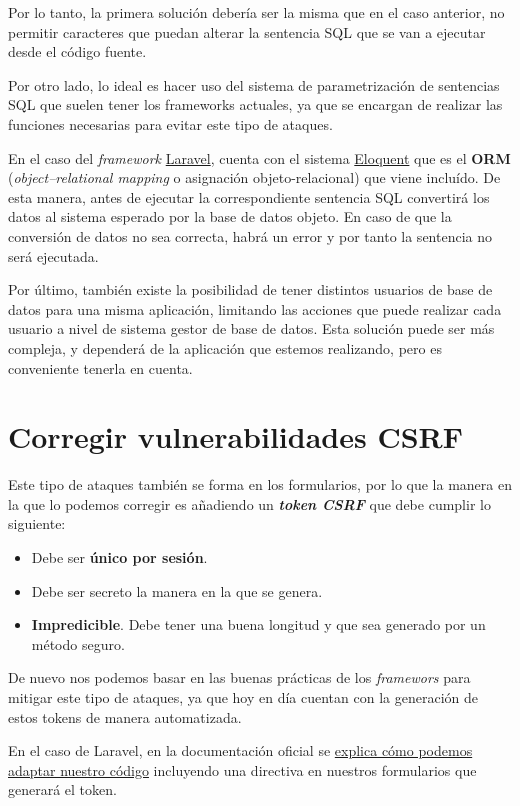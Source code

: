 \documentclass{\ClassPath/viu-tfm-template}
\begin{document}
Por lo tanto, la primera solución debería ser la misma que en el caso anterior, no permitir caracteres que puedan alterar la sentencia SQL que se van a ejecutar desde el código fuente.

Por otro lado, lo ideal es hacer uso del sistema de parametrización de sentencias SQL que suelen tener los frameworks actuales, ya que se encargan de realizar las funciones necesarias para evitar este tipo de ataques.

En el caso del \textit{framework} \href{https://laravel.com/}{Laravel}, cuenta con el sistema \href{https://laravel.com/docs/6.x/eloquent}{Eloquent} que es el \textbf{ORM} (\textit{object–relational mapping} o asignación objeto-relacional) que viene incluído. De esta manera, antes de ejecutar la correspondiente sentencia SQL convertirá los datos al sistema esperado por la base de datos objeto. En caso de que la conversión de datos no sea correcta, habrá un error y por tanto la sentencia no será ejecutada.


Por último, también existe la posibilidad de tener distintos usuarios de base de datos para una misma aplicación, limitando las acciones que puede realizar cada usuario a nivel de sistema gestor de base de datos. Esta solución puede ser más compleja, y dependerá de la aplicación que estemos realizando, pero es conveniente tenerla en cuenta.


\section{Corregir vulnerabilidades CSRF}
Este tipo de ataques también se forma en los formularios, por lo que la manera en la que lo podemos corregir es añadiendo un \textit{\textbf{token CSRF}} que debe cumplir lo siguiente:

\begin{itemize}
    \item Debe ser \textbf{único por sesión}.
    \item Debe ser secreto la manera en la que se genera.
    \item \textbf{Impredicible}. Debe tener una buena longitud y que sea generado por un método seguro.
\end{itemize}

De nuevo nos podemos basar en las buenas prácticas de los \textit{framewors} para mitigar este tipo de ataques, ya que hoy en día cuentan con la generación de estos tokens de manera automatizada.

En el caso de Laravel, en la documentación oficial se \href{https://laravel.com/docs/6.x/csrf}{explica cómo podemos adaptar nuestro código} incluyendo una directiva en nuestros formularios que generará el token.
\end{document}
